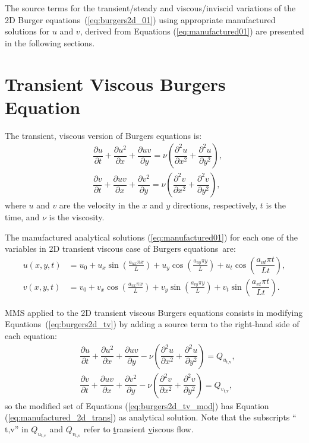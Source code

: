 \documentclass[10pt]{article}
\newcommand{\diff}[2] {\dfrac{\partial #1}{\partial #2}}
\begin{document}
The source terms for the transient/steady and viscous/inviscid variations of the 2D Burger equations~(\ref{eq:burgers2d_01}) using appropriate manufactured solutions  for $u$ and $v$, %
derived from Equations (\ref{eq:manufactured01})  
are presented in the following sections. 


\section{Transient Viscous Burgers Equation}


The transient, viscous version of Burgers equations is:
\begin{equation}
 \label{eq:burgers2d_tv}
\begin{split}
 &\diff{ u}{t} + \diff{ u^2 }{x}+\diff{uv}{y}=\nu \left( \diff{^2u}{ x^2}+ \diff{^2u }{y^2}\right),\\
&\diff{ v}{t}+ \diff{ u v}{x} + \diff{  v^2 }{y}=\nu \left( \diff{^2v}{ x^2}+ \diff{^2v }{y^2}\right),
\end{split}
\end{equation}
%
where $u$ and $v$ are the velocity in the  $x$ and $y$  directions, respectively, $t$ is the time, and $\nu$ is the viscosity.


The manufactured analytical solutions (\ref{eq:manufactured01}) for each one of the variables in 2D transient viscous case of Burgers equations~are:
\begin{equation}
\begin{split}
\label{eq:manufactured_2d_trans}
u\left(x,y,t\right) &= u_{0}+u_{x} \sin\left(\frac{a_{u x} \pi x}{L}\right)+u_{y} \cos\left(\frac{a_{u y} \pi y}{L}\right) + u_t \cos\left(\dfrac{a_{u t} \pi t}{Lt}\right),\\
v\left(x,y,t\right) &= v_{0}+v_{x} \cos\left(\frac{a_{v x} \pi x}{L}\right)+v_{y} \sin\left(\frac{a_{v y} \pi y}{L}\right)+ v_t \sin\left(\dfrac{a_{v t} \pi t}{Lt}\right).
\end{split}
\end{equation}


MMS applied to the 2D transient viscous Burgers equations consists in modifying Equations~(\ref{eq:burgers2d_tv}) by adding a source term to the right-hand side of each equation:
\begin{equation}
 \label{eq:burgers2d_tv_mod}
\begin{split}
 &\diff{ u}{t} + \diff{ u^2 }{x}+\diff{uv}{y}-\nu \left( \diff{^2u}{ x^2}+ \diff{^2u }{y^2}\right)= Q_{u_\text{t,v}},\\
&\diff{ v}{t}+ \diff{ u v}{x} + \diff{  v^2 }{y}-\nu \left( \diff{^2v}{ x^2}+ \diff{^2v }{y^2}\right)=Q_{v_\text{t,v}},
\end{split}
\end{equation}
so the modified set of Equations (\ref{eq:burgers2d_tv_mod}) has Equation (\ref{eq:manufactured_2d_trans}) as analytical solution. Note that the subscripts ``$\text{t,v}$'' in $Q_{u_\text{t,v}}$ and $Q_{v_\text{t,v}}$  refer to \underline{t}ransient \underline{v}iscous flow.
\end{document}
